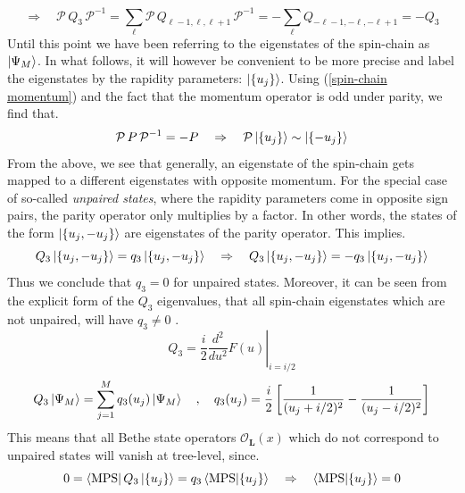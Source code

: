 %
%
\begin{equation}
\Rightarrow \quad
%
\mathcal{P} \, Q_3 \, \mathcal{P}^{-1}
=
\sum_{\ell}
\mathcal{P} \, Q_{\ell-1,\ell,\ell+1} \, \mathcal{P}^{-1}
=
-\sum_{\ell}
Q_{-\ell-1, -\ell, -\ell+1}
=
-Q_3
\end{equation}
%
%
Until this point  we have been referring to the eigenstates of the spin-chain as $\ket{\Psi_M}$. In what follows, it will however be convenient to be more precise and label the eigenstates by the rapidity parameters: $\ket{\{ u_j \}}$. Using (\ref{spin-chain momentum}) and the fact that the momentum operator is odd under parity, we find that.
%
%
\begin{equation}
\mathcal{P} \, P \, \mathcal{P}^{-1} = -P
%
\quad \Rightarrow \quad
%
\mathcal{P} \ket{\{ u_j \}} \sim \ket{\{ -u_j \}}
\end{equation}
%
%
From the above, we see that generally, an eigenstate of the spin-chain gets mapped to a different eigenstates with opposite momentum. For the special case of so-called \textit{unpaired states}, where the rapidity parameters come in opposite sign pairs, the parity operator only multiplies by a factor. In other words, the states of the form $\ket{\{ u_j , -u_j \}}$ are eigenstates of the parity operator. This implies.
%
%
\begin{equation}
Q_3 \ket{\{ u_j, -u_j \}} = q_3 \ket{\{ u_j, -u_j \}}
%
\quad \Rightarrow \quad
%
Q_3 \ket{\{ u_j, -u_j \}} = -q_3 \ket{\{ u_j, -u_j \}}
\end{equation}
%
%
Thus we conclude that $q_3 = 0$ for unpaired states. Moreover, it can be seen from the explicit form of the $Q_3$ eigenvalues, that all spin-chain eigenstates which are not unpaired, will have $q_3 \neq 0$ \cite{Conserved charges eigenvalues}.
%
%
\begin{equation}
Q_3 = \frac{i}{2} \left. \frac{d^2}{du^2} F(u) \right|_{i=i/2}
\end{equation}
%
%
\begin{equation}
Q_3 \ket{\Psi_M} = \sum_{j=1}^M q_3(u_j) \ket{\Psi_M}
%
\quad , \quad
%
q_3(u_j) = \frac{i}{2}
\left[ \frac{1}{(u_j + i/2)^2} - \frac{1}{(u_j - i/2)^2} \right]
\end{equation}
%
%
This means that all Bethe state operators $\mathcal{O}_{\boldsymbol{L}}(x)$ which do not correspond to unpaired states will vanish at tree-level, since.
%
%
\begin{equation}
0 = \bra{\text{MPS}} Q_3 \ket{ \{ u_j \} }
= q_3 \braket{\text{MPS}}{ \{ u_j \} }
%
\quad \Rightarrow \quad
%
\braket{\text{MPS}}{ \{ u_j \} } = 0
\end{equation}
